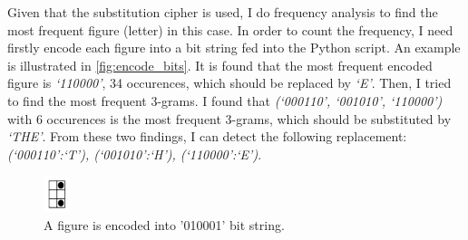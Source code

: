 Given that the substitution cipher is used, I do frequency analysis to find
the most frequent figure (letter) in this case. In order to count the frequency,
I need firstly encode each figure into a bit string fed into the Python script.
An example is illustrated in \autoref{fig:encode_bits}. It is found that the
most frequent encoded figure is \emph{`110000'}, 34 occurences, which should be
replaced by \emph{`E'}. Then, I tried to find the most frequent 3-grams. I found that
\emph{(`000110', `001010', `110000')} with 6 occurences is the most frequent 3-grams,
which should be substituted by \emph{`THE'}. From these two findings, I can detect
the following replacement: \emph{(`000110':`T'), (`001010':`H'), (`110000':`E')}.

\begin{figure}
    \centering
    \includegraphics[width=\textwidth,height=\textheight,keepaspectratio]
    {figures/encoded_figure.png}
    \caption{A figure is encoded into '010001' bit string.}\label{fig:encode_bits}
\end{figure}